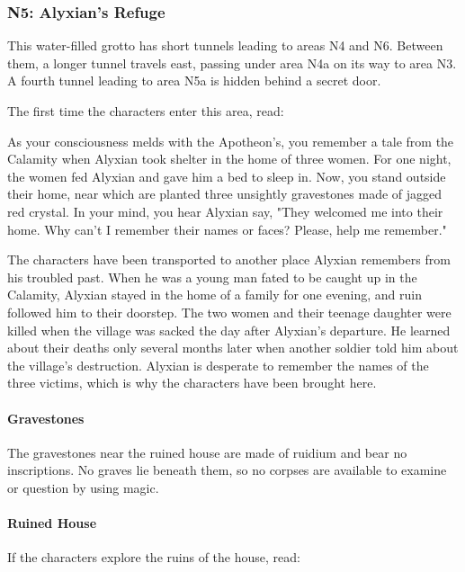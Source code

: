 \documentclass[letterpaper, 11pt, bg=full, twocolumn]{dndbook}
\begin{document}
\subsubsection{N5: Alyxian's Refuge}

This water-filled grotto has short tunnels leading to areas N4 and N6. Between them, a longer tunnel travels east, passing under area N4a on its way to area N3. A fourth tunnel leading to area N5a is hidden behind a secret door.

The first time the characters enter this area, read:

\begin{DndReadAloud}
As your consciousness melds with the Apotheon's, you remember a tale from the Calamity when Alyxian took shelter in the home of three women. For one night, the women fed Alyxian and gave him a bed to sleep in. Now, you stand outside their home, near which are planted three unsightly gravestones made of jagged red crystal.
In your mind, you hear Alyxian say, "They welcomed me into their home. Why can't I remember their names or faces? Please, help me remember."
\end{DndReadAloud}

The characters have been transported to another place Alyxian remembers from his troubled past. When he was a young man fated to be caught up in the Calamity, Alyxian stayed in the home of a family for one evening, and ruin followed him to their doorstep. The two women and their teenage daughter were killed when the village was sacked the day after Alyxian's departure. He learned about their deaths only several months later when another soldier told him about the village's destruction. Alyxian is desperate to remember the names of the three victims, which is why the characters have been brought here.

\paragraph{Gravestones}

The gravestones near the ruined house are made of ruidium and bear no inscriptions. No graves lie beneath them, so no corpses are available to examine or question by using magic.

\paragraph{Ruined House}

If the characters explore the ruins of the house, read:
\end{document}
